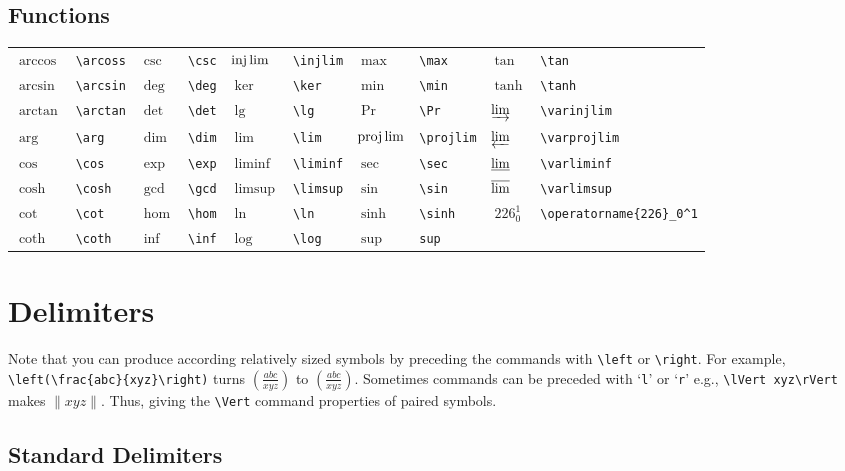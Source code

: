\documentclass[10pt, english]{article}
\begin{document}
	\subsection{Functions}

	\begin{center}
		\scriptsize
	\begin{tabular}{ll|ll|ll|ll|ll}
		$\arccos$ & \verb|\arcoss| & $\csc$ & \verb|\csc| & $\injlim$ & \verb|\injlim| & $\max$ & \verb|\max| & $\tan$ & \verb|\tan| \\
		$\arcsin$ & \verb|\arcsin| & $\deg$ & \verb|\deg| & $\ker$ & \verb|\ker| & $\min$ & \verb|\min| & $\tanh$ & \verb|\tanh| \\
		$\arctan$ & \verb|\arctan| & $\det$ & \verb|\det| & $\lg$ & \verb|\lg| & $\Pr$ & \verb|\Pr| & $\varinjlim$ & \verb|\varinjlim| \\
		$\arg$ & \verb|\arg| & $\dim$ & \verb|\dim| & $\lim$ & \verb|\lim| & $\projlim$ & \verb|\projlim| & $\varprojlim$ & \verb|\varprojlim| \\
		$\cos$ & \verb|\cos| & $\exp$ & \verb|\exp| & $\liminf$ & \verb|\liminf| & $\sec$ & \verb|\sec| & $\varliminf$ & \verb|\varliminf| \\
		$\cosh$ & \verb|\cosh| & $\gcd$ & \verb|\gcd| & $\limsup$ & \verb|\limsup| & $\sin$ & \verb|\sin| & $\varlimsup$ & \verb|\varlimsup| \\
		$\cot$ & \verb|\cot| & $\hom$ & \verb|\hom| & $\ln$ & \verb|\ln| & $\sinh$ & \verb|\sinh| & $\operatorname{226}_0^1$ & \verb|\operatorname{226}_0^1| \\
		$\coth$ & \verb|\coth| & $\inf$ & \verb|\inf| & $\log$ & \verb|\log| & $\sup$ & \verb|sup| \\ 
	\end{tabular}
	\end{center}

\section{Delimiters}

	Note that you can produce according relatively sized symbols by preceding the commands with \verb|\left| or \verb|\right|. For example, \verb|\left(\frac{abc}{xyz}\right)| turns $(\frac{abc}{xyz})$ to $\left(\frac{abc}{xyz}\right)$. Sometimes commands can be preceded with  `\verb|l|' or `\verb|r|' e.g., \verb|\lVert xyz\rVert| makes $\lVert xyz\rVert$. Thus, giving the \verb|\Vert| command properties of paired symbols.

	\subsection{Standard Delimiters}
\end{document}
